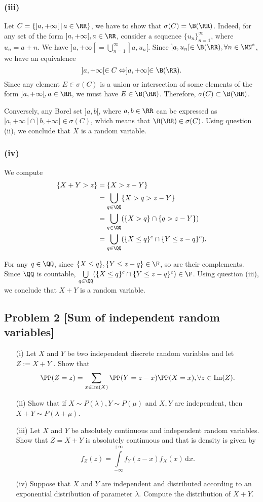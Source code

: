 \subsubsection*{(iii)} Let $C=\{]a,+\infty[\,|\, a\in\RR\}$, 
we have to show that $\sigma(C)=\B(\RR)$. Indeed, for any set of the form $]a,+\infty[, a\in\RR$, consider a sequence $\{u_n\}_{n=1}^{\infty}$, where $u_n=a+n$. We have $]a,+\infty[=\bigcup\limits_{n=1}^{\infty} ]a,u_n[$. Since $]a,u_n[\in\B(\RR),\forall n\in\NN^*$, we have an equivalence
$$]a,+\infty[\in C\Leftrightarrow ]a,+\infty[\in \B(\RR).$$
Since any element $E\in\sigma(C)$ is a union or intersection of some elements of the form $]a,+\infty[, a\in\RR$, we must have $E\in\B(\RR)$. Therefore, $\sigma(C)\subset\B(\RR)$. 

Conversely, any Borel set $]a,b[$, where $a,b\in\RR$ can be expressed as $]a,+\infty[\cap]b,+\infty[ \in \sigma(C)$, which means that $\B(\RR)\in\sigma(C)$. Using question (ii), we conclude that $X$ is a random variable.

\subsubsection*{(iv)} We compute
\begin{align*}
    \{X+Y > z\} 
    &= \{X > z - Y\}\\
    &=\bigcup\limits_{q\in\QQ} \{X > q > z - Y\}\\
    &= \bigcup\limits_{q\in\QQ} (\{X > q\} \cap \{q > z - Y\})\\
    &= \bigcup\limits_{q\in\QQ} (\{X \le q\}^c \cap \{Y \le z-q\}^c).
\end{align*}

For any $q\in\QQ$, since $\{X \le q\}, \{Y \le z-q\}\in \F$, so are their complements. Since $\QQ$ is countable, $\bigcup\limits_{q\in\QQ} (\{X \le q\}^c \cap \{Y \le z-q\}^c)\in \F$. Using question (iii), we conclude that $X+Y$ is a random variable.

\subsection*{Problem 2 [Sum of independent random variables]} 
\begin{enumerate}
    \item [(i)] Let $X$ and $Y$ be two independent discrete random variables and let $Z := X + Y$ . Show that
$$\PP(Z = z) = \sum\limits_{x\in\mathrm{Im}(X)}
\PP(Y=z-x)\PP(X = x), \forall z \in \mathrm{Im}(Z).$$
    \item [(ii)] Show that if $X \sim P(\lambda), Y \sim P(\mu)$ and $X, Y$ are independent, then $X + Y \sim P(\lambda + \mu)$.
    \item [(iii)]  Let $X$ and $Y$ be absolutely continuous and independent random variables. Show that
$Z = X + Y$ is absolutely continuous and that is density is given by
$$f_Z(z) = \int\limits_{-\infty}^{+\infty} f_Y(z-x)f_X(x)\,\mathrm{d}x.$$
\item [(iv)] Suppose that $X$ and $Y$ are independent and distributed according to an exponential
distribution of parameter $\lambda$. Compute the distribution of $X + Y$.
\end{enumerate}

